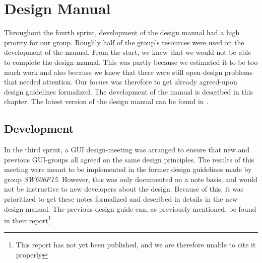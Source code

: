 
\chapter{Design Manual}
\label{cha:design_manual}

Throughout the fourth sprint, development of the design manual had a high priority for our group. Roughly half of the group's resources were used on the development of the manual. From the start, we knew that we would not be able to complete the design manual. This was partly because we estimated it to be too much work and also because we knew that there were still open design problems that needed attention. Our focues was therefore to get already agreed-upon design guidelines formalized. The development of the manual is described in this chapter. The latest version of the design manual can be found in .

\section{Development}
\label{sec:development}
In the third sprint, a GUI design-meeting was arranged to ensure that new and previous GUI-groups all agreed on the same design principles.  The results of this meeting were meant to be implemented in the former design guidelines made by group \emph{SW606F15}. However, this was only documented on a note basis, and would not be instructive to new \giraf developers about the design. Because of this, it was prioritized to get these notes formalized and described in details in the new design manual. The previous design guide can, as previously mentioned, be found in their report\footnote{This report has not yet been published, and we are therefore unable to cite it properly}.

